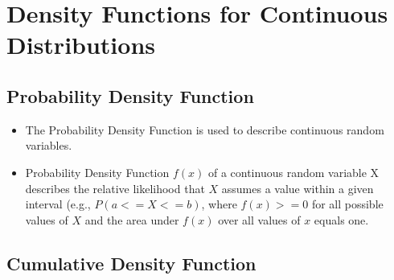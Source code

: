 \documentclass[
  letterpaper,
  DIV=11,
  numbers=noendperiod]{scrreprt}
\providecommand{\tightlist}{%
  \setlength{\itemsep}{0pt}\setlength{\parskip}{0pt}}\usepackage{longtable,booktabs,array}
\begin{document}
\section{Density Functions for Continuous
Distributions}\label{density-functions-for-continuous-distributions}

\subsection{Probability Density
Function}\label{probability-density-function}

\begin{itemize}
\tightlist
\item
  The Probability Density Function is used to describe continuous random
  variables.
\item
  Probability Density Function \(f(x)\) of a continuous random variable
  X describes the relative likelihood that \(X\) assumes a value within
  a given interval (e.g., \(P(a<=X<=b)\), where \(f(x)>=0\) for all
  possible values of \(X\) and the area under \(f(x)\) over all values
  of \(x\) equals one.
\end{itemize}

\subsection{Cumulative Density
Function}\label{cumulative-density-function}
\end{document}
